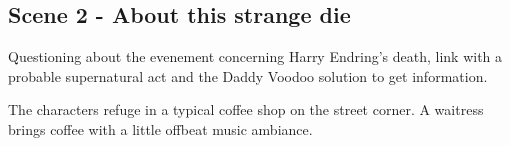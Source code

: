 \subsection{Scene 2 -  About this strange die}

\begin{scene_summary}
Questioning about the evenement concerning Harry Endring's death, link with a probable supernatural act and the Daddy Voodoo solution to get information.
\end{scene_summary}


\begin{location_description}
The characters refuge in a typical coffee shop on the street corner. A waitress brings coffee  with a little offbeat music ambiance.
\end{location_description}